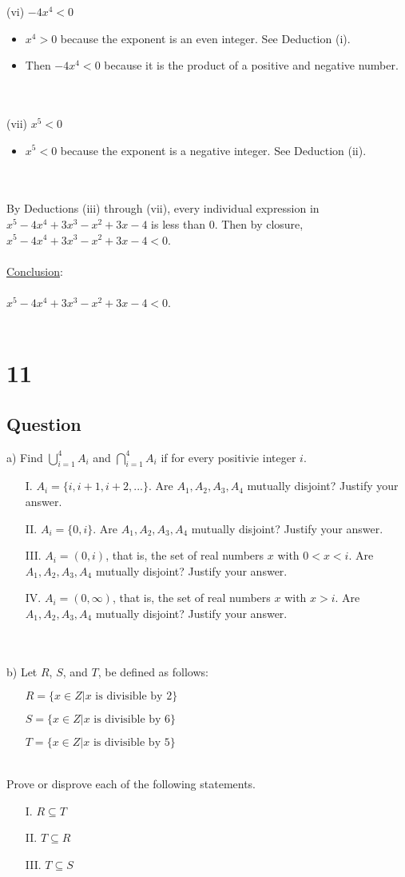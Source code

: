 \documentclass[12pt]{article}
\newcommand{\xlist}[1]{
    \begin{itemize}
        \renewcommand{\labelitemi}{$\centerdot$}
        #1
    \end{itemize}
    \newblock
    \\ \\
}
\newcommand{\xconclusion}[1]{
    \underline{Conclusion}:
    \\ \\
    #1
    \\ \\
}
\begin{document}
(vi) $-4x^4 < 0$
\xlist{
  \item $x^4 > 0$ because the exponent is an even integer. See Deduction (i).
  \item Then $-4x^4 < 0$ because it is the product of a positive and negative number.
}
(vii) $x^5 < 0$
\xlist{
  \item $x^5 < 0$ because the exponent is a negative integer. See Deduction (ii).
}
By Deductions (iii) through (vii), every individual expression in $x^5 - 4x^4 + 3x^3 - x^2 + 3x - 4$ is less than 0. 
Then by closure, $x^5 - 4x^4 + 3x^3 - x^2 + 3x - 4 < 0$. \\ \\
\xconclusion{$x^5 - 4x^4 + 3x^3 - x^2 + 3x - 4 < 0$.}

\section*{11}
\subsection*{Question}

a) Find $\bigcup_{i=1}^{4}A_i$ and $\bigcap_{i=1}^{4}A_i$ if for every positivie integer $i$.
\begin{itemize}
  \item [I.] $A_i = \{i, i+1, i+2, ...\}$. Are $A_1, A_2, A_3, A_4$ mutually disjoint? Justify your answer.
  \item [II.] $A_i = \{0, i\}$. Are $A_1, A_2, A_3, A_4$ mutually disjoint? Justify your answer.
  \item [III.] $A_i = (0,i)$, that is, the set of real numbers $x$ with $0<x<i$. Are $A_1, A_2, A_3, A_4$ mutually disjoint? Justify your answer.
  \item [IV.] $A_i = (0,\infty)$, that is, the set of real numbers $x$ with $x>i$. Are $A_1, A_2, A_3, A_4$ mutually disjoint? Justify your answer.
\end{itemize}
\newblock
\\ \\
b) Let $R$, $S$, and $T$, be defined as follows:
\begin{itemize}
  \item [] $R = \{x \in Z | x \text{ is divisible by } 2\}$ \\
  \item [] $S = \{x \in Z | x \text{ is divisible by } 6\}$ \\
  \item [] $T = \{x \in Z | x \text{ is divisible by } 5\}$
\end{itemize}
\newblock
\\
Prove or disprove each of the following statements.
\begin{itemize}
  \item [I.] $R \subseteq T$
  \item [II.] $T \subseteq R$
  \item [III.] $T \subseteq S$
\end{itemize}
\end{document}
